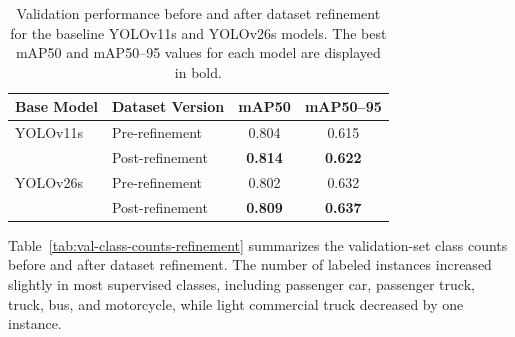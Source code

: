 \begin{table}[!htbp]
    \centering
    \caption{Validation performance before and after dataset refinement for the 
             baseline YOLOv11s and YOLOv26s models. The best mAP50 and mAP50--95 values 
            for each model are displayed in bold.}
    \label{tab:dataset-refinement-results}
    \begin{tabular}{l l c c}
        \toprule
        Base Model & Dataset Version & mAP50 & mAP50--95 \\
        \midrule
        YOLOv11s & Pre-refinement  & 0.804 & 0.615 \\
                 & Post-refinement & \textbf{0.814} & \textbf{0.622} \\
        \midrule
        YOLOv26s & Pre-refinement  & 0.802 & 0.632 \\
                 & Post-refinement & \textbf{0.809} & \textbf{0.637} \\
        \bottomrule
    \end{tabular}
\end{table}
\FloatBarrier

Table~\ref{tab:val-class-counts-refinement} summarizes the validation-set class 
counts before and after dataset refinement. The number of labeled instances increased 
slightly in most supervised classes, including passenger car, passenger truck, 
truck, bus, and motorcycle, while light commercial truck decreased by one instance.

